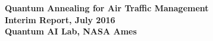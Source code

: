 \documentclass[10pt]{article}
\begin{document}
\begin{center}\Large
\textbf{Quantum Annealing for Air Traffic Management\\Interim Report, July 2016\\Quantum AI Lab, NASA Ames}
\end{center}

\begin{multicols}{2}
%
%


% 
%
%


\end{multicols}


\small


\end{document}
